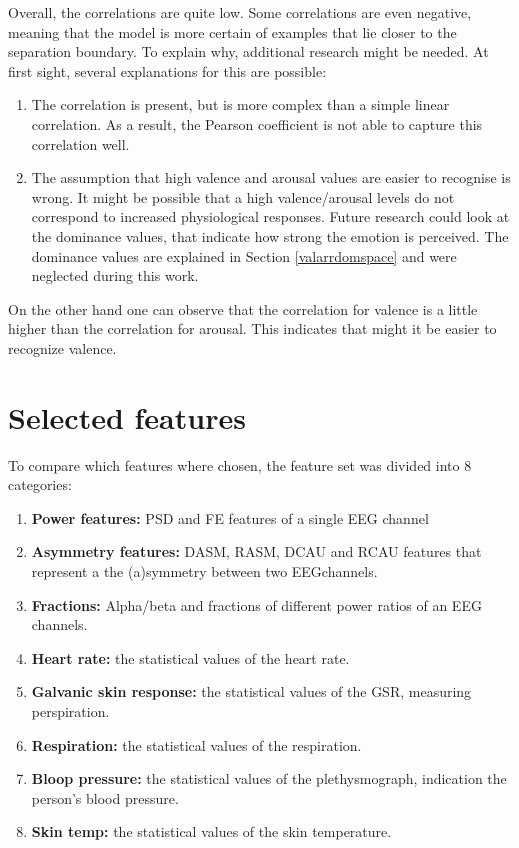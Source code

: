 Overall, the correlations are quite low. Some correlations are even negative, meaning that the model is more certain of examples that lie closer to the separation boundary. To explain why, additional research might be needed. At first sight, several explanations for this are possible:
\begin{enumerate}
\item The correlation is present, but is more complex than a simple linear correlation. As a result, the Pearson coefficient is not able to capture this correlation well.
\item The assumption that high valence and arousal values are easier to recognise is wrong. It might be possible that a high valence/arousal levels do not correspond to increased physiological responses. Future research could look at the dominance values, that indicate how strong the emotion is perceived. The dominance values are explained in Section \ref{valarrdomspace} and were neglected during this work.
\end{enumerate}

\npar

On the other hand one can observe that the correlation for valence is a little higher than the correlation for arousal. This indicates that might it be easier to recognize valence.

\section{Selected features}

To compare which features where chosen, the feature set was divided into 8 categories:
\begin{enumerate}
\item \textbf{Power features:} PSD and FE features of a single EEG channel
\item \textbf{Asymmetry features:} DASM, RASM, DCAU and RCAU features that represent a the (a)symmetry between two EEGchannels.
\item \textbf{Fractions:} Alpha/beta and fractions of different power ratios of an EEG channels.

\item \textbf{Heart rate:} the statistical values of the heart rate.
\item \textbf{Galvanic skin response:} the statistical values of the GSR, measuring perspiration.
\item \textbf{Respiration:} the statistical values of the respiration.
\item \textbf{Bloop pressure:} the statistical values of the plethysmograph, indication the person's blood pressure.
\item \textbf{Skin temp:} the statistical values of the skin temperature.
\end{enumerate} 

